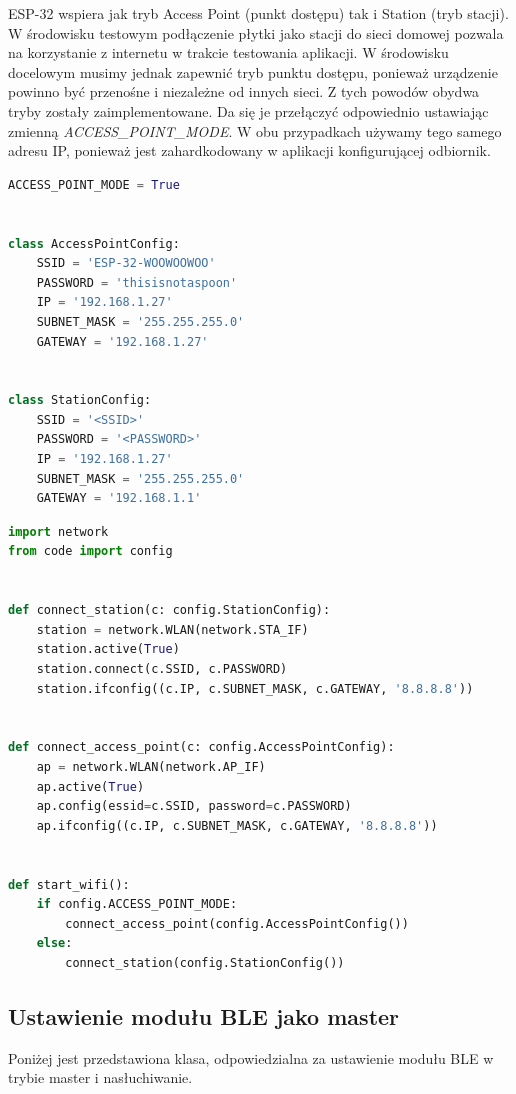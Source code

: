 \documentclass[eng,printmode]{mgr}
\begin{document}
ESP-32 wspiera jak tryb Access Point (punkt dostępu) tak i Station (tryb stacji). W środowisku testowym podłączenie płytki jako stacji do sieci domowej pozwala na korzystanie z internetu w trakcie testowania aplikacji. W środowisku docelowym musimy jednak zapewnić tryb punktu dostępu, ponieważ urządzenie powinno być przenośne i niezależne od innych sieci. Z tych powodów obydwa tryby zostały zaimplementowane. Da się je przełączyć odpowiednio ustawiając zmienną \textit{ACCESS\_POINT\_MODE}. W obu przypadkach używamy tego samego adresu IP, ponieważ jest zahardkodowany w aplikacji konfigurującej odbiornik.


\begin{lstlisting}[language=Python]
ACCESS_POINT_MODE = True


class AccessPointConfig:
    SSID = 'ESP-32-WOOWOOWOO'
    PASSWORD = 'thisisnotaspoon'
    IP = '192.168.1.27'
    SUBNET_MASK = '255.255.255.0'
    GATEWAY = '192.168.1.27'


class StationConfig:
    SSID = '<SSID>'
    PASSWORD = '<PASSWORD>'
    IP = '192.168.1.27'
    SUBNET_MASK = '255.255.255.0'
    GATEWAY = '192.168.1.1'
\end{lstlisting}

\pagebreak

\begin{lstlisting}[language=Python]
import network
from code import config


def connect_station(c: config.StationConfig):
    station = network.WLAN(network.STA_IF)
    station.active(True)
    station.connect(c.SSID, c.PASSWORD)
    station.ifconfig((c.IP, c.SUBNET_MASK, c.GATEWAY, '8.8.8.8'))


def connect_access_point(c: config.AccessPointConfig):
    ap = network.WLAN(network.AP_IF)
    ap.active(True)
    ap.config(essid=c.SSID, password=c.PASSWORD)
    ap.ifconfig((c.IP, c.SUBNET_MASK, c.GATEWAY, '8.8.8.8'))


def start_wifi():
    if config.ACCESS_POINT_MODE:
        connect_access_point(config.AccessPointConfig())
    else:
        connect_station(config.StationConfig())

\end{lstlisting}

\pagebreak
\subsection{Ustawienie modułu BLE jako master}

Poniżej jest przedstawiona klasa, odpowiedzialna za ustawienie modułu BLE w trybie master i nasłuchiwanie.
\end{document}

